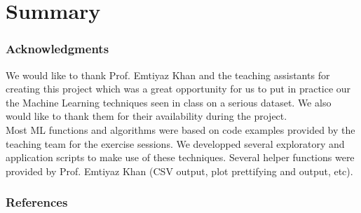 \documentclass{article} %
\begin{document}
\section{Summary}

\subsubsection*{Acknowledgments}
  We would like to thank Prof. Emtiyaz Khan and the teaching assistants for creating this project which was a great opportunity for us to put in practice our the Machine Learning techniques seen in class on a serious dataset. We also would like to thank them for their availability during the project.\\
  Most ML functions and algorithms were based on code examples provided by the teaching team for the exercise sessions. We developped several exploratory and application scripts to make use of these techniques. Several helper functions were provided by Prof. Emtiyaz Khan (CSV output, plot prettifying and output, etc).
\subsubsection*{References}
\end{document}
